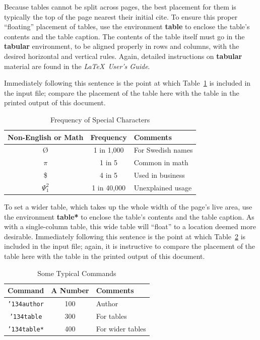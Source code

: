 \documentclass[sigconf, authordraft]{acmart}
\begin{document}
	Because tables cannot be split across pages, the best placement for them is
	typically the top of the page nearest their initial cite. To ensure this proper
	``floating'' placement of tables, use the environment \textbf{table} to enclose
	the table's contents and the table caption. The contents of the table itself
	must go in the \textbf{tabular} environment, to be aligned properly in rows
	and columns, with the desired horizontal and vertical rules. Again, detailed instructions
	on \textbf{tabular} material are found in the \textit{\LaTeX\ User's Guide}.

	Immediately following this sentence is the point at which Table~\ref{tab:freq}
	is included in the input file; compare the placement of the table here with
	the table in the printed output of this document.

	\begin{table}
		\caption{Frequency of Special Characters}
		\label{tab:freq}
		\begin{tabular}{ccl}
			\toprule Non-English or Math & Frequency   & Comments          \\
			\midrule \O                  & 1 in 1,000  & For Swedish names \\
			$\pi$                        & 1 in 5      & Common in math    \\
			\$                           & 4 in 5      & Used in business  \\
			$\Psi^{2}_{1}$               & 1 in 40,000 & Unexplained usage \\
			\bottomrule
		\end{tabular}
	\end{table}

	To set a wider table, which takes up the whole width of the page's live area, use
	the environment \textbf{table*} to enclose the table's contents and the table caption.
	As with a single-column table, this wide table will ``float'' to a location deemed
	more desirable. Immediately following this sentence is the point at which
	Table~\ref{tab:commands} is included in the input file; again, it is
	instructive to compare the placement of the table here with the table in the
	printed output of this document.

	\begin{table}
		\caption{Some Typical Commands}
		\label{tab:commands}
		\begin{tabular}{ccl}
			\toprule Command                    & A Number & Comments         \\
			\midrule \texttt{{\char'134}author} & 100      & Author           \\
			\texttt{{\char'134}table}           & 300      & For tables       \\
			\texttt{{\char'134}table*}          & 400      & For wider tables \\
			\bottomrule
		\end{tabular}
	\end{table}
\end{document}
